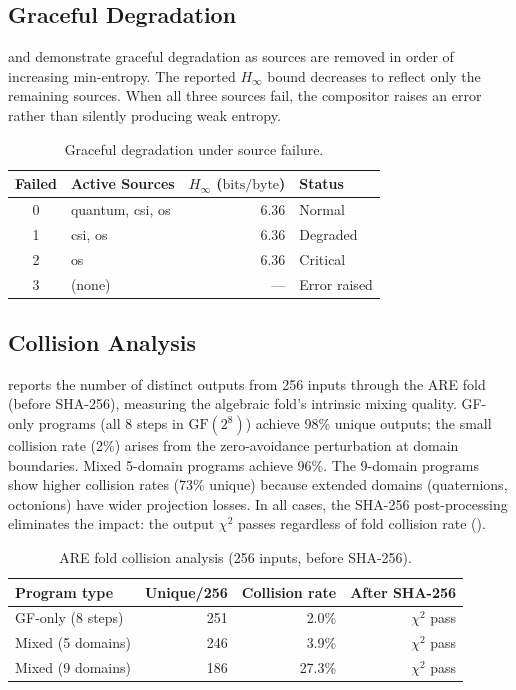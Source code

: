 \documentclass[sigconf,anonymous,review]{acmart}
\theoremstyle{acmdefinition}%
\theoremstyle{acmplain}%
\newcommand{\minentropy}{H_{\infty}}
\newcommand{\bpb}{\text{bits/byte}}
\begin{document}
\subsection{Graceful Degradation}
\label{sec:eval:degradation}

 and  demonstrate graceful degradation as sources
are removed in order of increasing min-entropy.
%
The reported $\minentropy$ bound decreases to reflect only the
remaining sources.
%
When all three sources fail, the compositor raises an error rather
than silently producing weak entropy.

\begin{table}[t]
  \centering
  \caption{Graceful degradation under source failure.}
  \label{tab:degradation}
  \begin{tabular}{@{}clrl@{}}
    \toprule
    Failed & Active Sources & $\minentropy$ ($\bpb$) & Status \\
    \midrule
    0 & quantum, csi, os & 6.36 & Normal \\
    1 & csi, os           & 6.36 & Degraded \\
    2 & os                 & 6.36 & Critical \\
    3 & (none)             & ---  & Error raised \\
    \bottomrule
  \end{tabular}
\end{table}

\subsection{Collision Analysis}
\label{sec:eval:collision}

 reports the number of distinct outputs from 256
inputs through the ARE fold (before SHA-256), measuring the
algebraic fold's intrinsic mixing quality.
%
GF-only programs (all 8 steps in $\mathrm{GF}(2^8)$) achieve 98\%
unique outputs; the small collision rate (2\%) arises from the
zero-avoidance perturbation at domain boundaries.
%
Mixed 5-domain programs achieve 96\%.
%
The 9-domain programs show higher collision rates (73\% unique)
because extended domains (quaternions, octonions) have wider
projection losses.
%
In all cases, the SHA-256 post-processing eliminates the impact:
the output $\chi^2$ passes regardless of fold collision rate
().

\begin{table}[t]
  \centering
  \caption{ARE fold collision analysis (256 inputs, before SHA-256).}
  \label{tab:collision}
  \begin{tabular}{@{}lrrr@{}}
    \toprule
    Program type & Unique/256 & Collision rate & After SHA-256 \\
    \midrule
    GF-only (8 steps)   & 251 & 2.0\%  & $\chi^2$ pass \\
    Mixed (5 domains)    & 246 & 3.9\%  & $\chi^2$ pass \\
    Mixed (9 domains)    & 186 & 27.3\% & $\chi^2$ pass \\
    \bottomrule
  \end{tabular}
\end{table}
\end{document}
